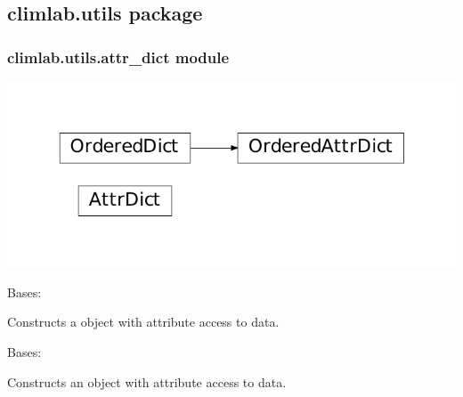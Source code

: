 \documentclass[a4paper,10pt,english]{sphinxmanual}
\begin{document}
\begin{fulllineitems}
\begin{quote}
\begin{description}
\end{description}\end{quote}

\end{fulllineitems}



\subsection{climlab.utils package}
\label{api/climlab.utils::doc}\label{api/climlab.utils:climlab-utils-package}

\subsubsection{climlab.utils.attr\_dict module}
\label{api/climlab.utils:climlab-utils-attr-dict-module}
\includegraphics{inheritance-bef65cee25121f0f467c31bf205dd368e8cec68f.pdf}
\label{api/climlab.utils:module-climlab.utils.attr_dict}

\begin{fulllineitems}
\label{api/climlab.utils:climlab.utils.attr_dict.AttrDict}
Bases: \href{http://docs.python.org/2.7/library/stdtypes.html\#dict}{}

Constructs a \href{http://docs.python.org/2.7/library/stdtypes.html\#dict}{} object with attribute access to data.

\end{fulllineitems}


\begin{fulllineitems}
\label{api/climlab.utils:climlab.utils.attr_dict.OrderedAttrDict}
Bases: \href{http://docs.python.org/2.7/library/collections.html\#collections.OrderedDict}{}

Constructs an \href{http://docs.python.org/2.7/library/collections.html\#collections.OrderedDict}{} object with attribute access to data.

\end{fulllineitems}
\end{document}
